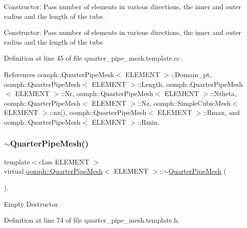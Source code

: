 Constructor\+: Pass number of elements in various directions, the inner and outer radius and the length of the tube. 

Constructor\+: Pass number of elements in various directions, the inner and outer radius and the length of the tube 

Definition at line 45 of file quarter\+\_\+pipe\+\_\+mesh.\+template.\+cc.



References oomph\+::\+Quarter\+Pipe\+Mesh$<$ E\+L\+E\+M\+E\+N\+T $>$\+::\+Domain\+\_\+pt, oomph\+::\+Quarter\+Pipe\+Mesh$<$ E\+L\+E\+M\+E\+N\+T $>$\+::\+Length, oomph\+::\+Quarter\+Pipe\+Mesh$<$ E\+L\+E\+M\+E\+N\+T $>$\+::\+Nr, oomph\+::\+Quarter\+Pipe\+Mesh$<$ E\+L\+E\+M\+E\+N\+T $>$\+::\+Ntheta, oomph\+::\+Quarter\+Pipe\+Mesh$<$ E\+L\+E\+M\+E\+N\+T $>$\+::\+Nz, oomph\+::\+Simple\+Cubic\+Mesh$<$ E\+L\+E\+M\+E\+N\+T $>$\+::nz(), oomph\+::\+Quarter\+Pipe\+Mesh$<$ E\+L\+E\+M\+E\+N\+T $>$\+::\+Rmax, and oomph\+::\+Quarter\+Pipe\+Mesh$<$ E\+L\+E\+M\+E\+N\+T $>$\+::\+Rmin.

\mbox{\label{classoomph_1_1QuarterPipeMesh_a591e2d48bd5783bb390093a18c066ffc}} 
\subsubsection{\texorpdfstring{$\sim$\+Quarter\+Pipe\+Mesh()}{~QuarterPipeMesh()}}
{\footnotesize\ttfamily template$<$class E\+L\+E\+M\+E\+NT $>$ \\
virtual \hyperlink{classoomph_1_1QuarterPipeMesh}{oomph\+::\+Quarter\+Pipe\+Mesh}$<$ E\+L\+E\+M\+E\+NT $>$\+::$\sim$\hyperlink{classoomph_1_1QuarterPipeMesh}{Quarter\+Pipe\+Mesh} (\begin{DoxyParamCaption}{ }\end{DoxyParamCaption})\hspace{0.3cm}{\ttfamily [inline]}, {\ttfamily [virtual]}}



Empty Destructor. 



Definition at line 74 of file quarter\+\_\+pipe\+\_\+mesh.\+template.\+h.



